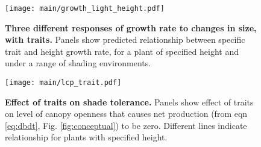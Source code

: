 \documentclass[a4paper,11pt]{article}
\begin{document}
\newpage

\begin{figure}[ht]
\centering
\texttt{[image: main/growth\_light\_height.pdf]}
\caption{\textbf{Three different responses of growth rate to changes in size, with traits.} Panels show predicted relationship between specific trait and height growth rate, for a plant of specified height and under a range of shading environments.
\label{fig:growth_light_height}}
\end{figure}

\newpage

\begin{figure}[ht]
\centering
\texttt{[image: main/lcp\_trait.pdf]}
\caption{\textbf{Effect of traits on shade tolerance.} Panels show effect of traits on level of canopy openness that causes net production (from eqn \ref{eq:dbdt}, Fig. \ref{fig:conceptual}) to be zero. Different lines indicate relationship for plants with specified height. \label{fig:wplcp}}
\end{figure}

\clearpage

\footnotesize


\end{document}
